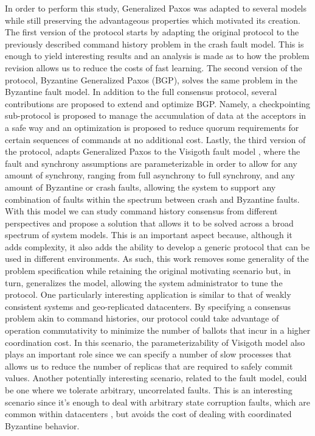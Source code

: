 In order to perform this study, Generalized Paxos was adapted to several models while still preserving the advantageous properties which motivated its creation. The first version of the protocol starts by adapting the original protocol to the previously described command history problem in the crash fault model. This is enough to yield interesting results and an analysis is made as to how the problem revision allows us to reduce the costs of fast learning. The second version of the protocol, Byzantine Generalized Paxos (BGP), solves the same problem in the Byzantine fault model. In addition to the full consensus protocol, several contributions are proposed to extend and optimize BGP. Namely, a checkpointing sub-protocol is proposed to manage the accumulation of data at the acceptors in a safe way and an optimization is proposed to reduce quorum requirements for certain sequences of commands at no additional cost. Lastly, the third version of the protocol, adapts Generalized Paxos to the Visigoth fault model \cite{Porto2015}, where the fault and synchrony assumptions are parameterizable in order to allow for any amount of synchrony, ranging from full asynchrony to full synchrony, and any amount of Byzantine or crash faults, allowing the system to support any combination of faults within the spectrum between crash and Byzantine faults. With this model we can study command history consensus from different perspectives and propose a solution that allows it to be solved across a broad spectrum of system models. This is an important aspect because, although it adds complexity, it also adds the ability to develop a generic protocol that can be used in different environments. As such, this work removes some generality of the problem specification while retaining the original motivating scenario but, in turn, generalizes the model, allowing the system administrator to tune the protocol.  One particularly interesting application is similar to that of weakly consistent systems and geo-replicated datacenters. By specifying a consensus problem akin to command histories, our protocol could take advantage of operation commutativity to minimize the number of ballots that incur in a higher coordination cost. In this scenario, the parameterizability of Visigoth model also plays an important role since we can specify a number of slow processes that allows us to reduce the number of replicas that are required to safely commit values. Another potentially interesting scenario, related to the fault model, could be one where we tolerate arbitrary, uncorrelated faults. This is an interesting scenario since it's enough to deal with arbitrary state corruption faults, which are common within datacenters \cite{AmazonS32}, but avoids the cost of dealing with coordinated Byzantine behavior.\par 


